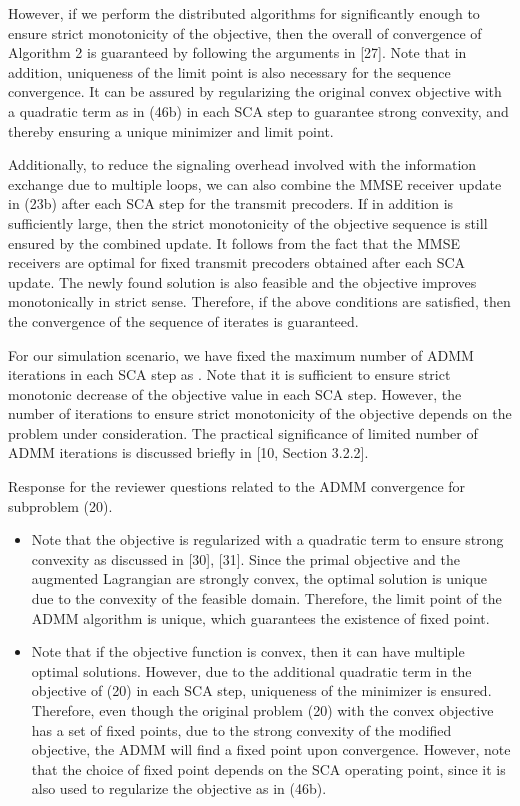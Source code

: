 \begin{enumerate}
However, if we perform the distributed algorithms for significantly enough to ensure strict monotonicity of the objective, then the overall of convergence of Algorithm 2 is guaranteed by following the arguments in [27]. Note that in addition, uniqueness of the limit point is also necessary for the sequence convergence. It can be assured by regularizing the original convex objective with a quadratic term as in (46b) in each \ac{SCA} step to guarantee strong convexity, and thereby ensuring a unique minimizer and limit point.

Additionally, to reduce the signaling overhead involved with the information exchange due to multiple loops, we can also combine the \ac{MMSE} receiver update in (23b) after each \ac{SCA} step for the transmit precoders. If in addition  is sufficiently large, then the strict monotonicity of the objective sequence is still ensured by the combined update. It follows from the fact that the \ac{MMSE} receivers are optimal for fixed transmit precoders obtained after each \ac{SCA} update. The newly found solution is also feasible and the objective improves monotonically in strict sense. Therefore, if the above conditions are satisfied, then the convergence of the sequence of iterates is guaranteed. 

For our simulation scenario, we have fixed the maximum number of \ac{ADMM} iterations in each \ac{SCA} step as . Note that it is sufficient to ensure strict monotonic decrease of the objective value in each \ac{SCA} step. However, the number of iterations to ensure strict monotonicity of the objective depends on the problem under consideration. The practical significance of limited number of \ac{ADMM} iterations is discussed briefly in [10, Section 3.2.2].

Response for the reviewer questions related to the \ac{ADMM} convergence for subproblem (20).

\begin{itemize}
\item Note that the objective is regularized with a quadratic term to ensure strong convexity as discussed in [30], [31]. Since the primal objective and the augmented Lagrangian are strongly convex, the optimal solution is unique due to the convexity of the feasible domain. Therefore, the limit point of the \ac{ADMM} algorithm is unique, which guarantees the existence of fixed point.

\item Note that if the objective function is convex, then it can have multiple optimal solutions. However, due to the additional quadratic term in the objective of (20) in each \ac{SCA} step, uniqueness of the minimizer is ensured. Therefore, even though the original problem (20) with the convex objective has a set of fixed points, due to the strong convexity of the modified objective, the \ac{ADMM} will find a fixed point upon convergence. However, note that the choice of fixed point depends on the \ac{SCA} operating point, since it is also used to regularize the objective as in (46b).


\end{itemize}
\end{enumerate}
